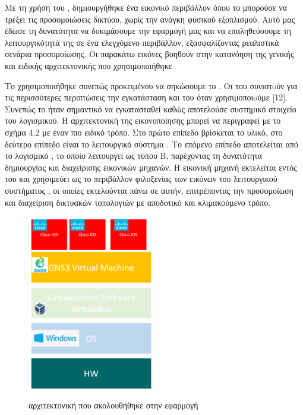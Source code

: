 Με τη χρήση του , δημιουργήθηκε ένα εικονικό περιβάλλον όπου το  μπορούσε να τρέξει τις προσομοιώσεις δικτύου, χωρίς την ανάγκη φυσικού εξοπλισμού. Αυτό μας έδωσε τη δυνατότητα να δοκιμάσουμε την εφαρμογή μας και να επαληθεύσουμε τη λειτουργικότητά της σε ένα ελεγχόμενο περιβάλλον, εξασφαλίζοντας ρεαλιστικά σενάρια προσομοίωσης.
Οι παρακάτω εικόνες βοηθούν στην κατανόηση της γενικής και ειδικής αρχιτεκτονικής που χρησιμοποιήθηκε



\FloatBarrier

Το  χρησιμοποιήθηκε συνεπώς προκειμένου να σηκώσουμε το . Οι  του  συνιστoύν για τις περισσότερες περιπτώσεις την εγκατάσταση και του  όταν χρησιμοποιoύμε [12]. Συνεπώς το  ήταν σημαντικό να εγκατασταθεί καθώς αποτελούσε συστημικό στοιχείο του  λογισμικού. Η αρχιτεκτονική της εικονοποίησης μπορεί να περιγραφεί με το σχήμα 4.2 με έναν πιο ειδικό τρόπο. Στο πρώτο επίπεδο βρίσκεται το υλικό, στο δεύτερο επίπεδο είναι το λειτουργικό σύστημα . Το επόμενο επίπεδο αποτελείται από το λογισμικό , το οποίο λειτουργεί ως  τύπου Β, παρέχοντας τη δυνατότητα δημιουργίας και διαχείρισης εικονικών μηχανών. Η εικονική μηχανή  εκτελείται εντός του  και χρησιμεύει ως το περιβάλλον φιλοξενίας των εικόνων του λειτουργικού συστήματος , οι οποίες εκτελούνται πάνω σε αυτήν, επιτρέποντας την προσομοίωση και διαχείριση δικτυακών τοπολογιών με αποδοτικό και κλιμακούμενο τρόπο.



\begin{figure}[htb]
	\centering
	\includegraphics[width=0.5\textwidth]{graphics/virtualization_architecture.PNG}
	\caption{ αρχιτεκτονική που ακολουθήθηκε στην εφαρμογή}
\end{figure}

